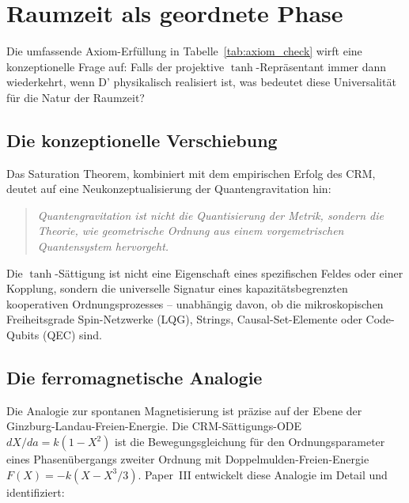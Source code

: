 \documentclass[aps,prd,twocolumn,superscriptaddress,nofootinbib]{revtex4-2}
\begin{document}
\section{Raumzeit als geordnete Phase}
\label{sec:ontology}

Die umfassende Axiom-Erfüllung in Tabelle~\ref{tab:axiom_check} wirft eine konzeptionelle Frage auf: Falls der projektive $\tanh$-Repräsentant immer dann wiederkehrt, wenn D' physikalisch realisiert ist, was bedeutet diese Universalität für die Natur der Raumzeit?

\subsection{Die konzeptionelle Verschiebung}

Das Saturation Theorem, kombiniert mit dem empirischen Erfolg des CRM, deutet auf eine Neukonzeptualisierung der Quantengravitation hin:

\begin{quote}
\textit{Quantengravitation ist nicht die Quantisierung der Metrik, sondern die Theorie, wie geometrische Ordnung aus einem vorgemetrischen Quantensystem hervorgeht.}
\end{quote}

Die $\tanh$-Sättigung ist nicht eine Eigenschaft eines spezifischen Feldes oder einer Kopplung, sondern die universelle Signatur eines kapazitätsbegrenzten kooperativen Ordnungsprozesses -- unabhängig davon, ob die mikroskopischen Freiheitsgrade Spin-Netzwerke (LQG), Strings, Causal-Set-Elemente oder Code-Qubits (QEC) sind.

\subsection{Die ferromagnetische Analogie}

Die Analogie zur spontanen Magnetisierung ist präzise auf der Ebene der Ginzburg-Landau-Freien-Energie. Die CRM-Sättigungs-ODE $dX/da = k(1 - X^2)$ ist die Bewegungsgleichung für den Ordnungsparameter eines Phasenübergangs zweiter Ordnung mit Doppelmulden-Freien-Energie $F(X) = -k(X - X^3/3)$. Paper~III \cite{Geiger2026c} entwickelt diese Analogie im Detail und identifiziert:
\end{document}
